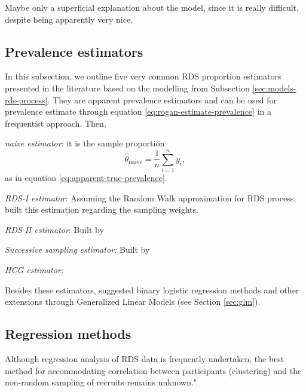 Maybe only a superficial explanation about the model, since it is really
difficult, despite being apparently very nice. \cite{mclaughlin2021bayesian}

\subsection{Prevalence estimators}

In this subsection, we outline five very common RDS proportion estimators presented in the
literature based on the modelling from Subsection
\ref{sec:models-rds-process}. They are apparent prevalence estimators and can
be used for prevalence estimate through equation
\eqref{eq:rogan-estimate-prevalence} in a frequentist approach. Then,  

\begin{alineas}
  \item {\em naive estimator}: it is the sample proportion 
  \begin{equation*}
    \hat{\theta}_{\mathrm{naive}} = \frac{1}{n}\sum_{i=1}^n y_i,
  \end{equation*} 
  as in equation \eqref{eq:apparent-true-prevalence}. 

  \item {\em RDS-I estimator}: Assuming the Random Walk approximation for RDS
  process, \textcite{salganik2004sampling} built this estimation regarding the
  sampling weights.  
  
  \item {\em RDS-II estimator}: Built by \cite{volz2008probability}
  \item {\em Successive sampling estimator:} Built by \cite{gile2011improved} 
  \item {\em HCG estimator:} 
\end{alineas}

Besides these estimators, \textcite{avery2021statistical} suggested binary logistic
regression methods and other extensions through Generalized Linear Models (see
Section \ref{sec:glm}). 

\subsection{Regression methods}

Although regression analysis of RDS data is frequently undertaken, the best method for accommodating
  correlation between participants (clustering) and the non-random sampling of
  recruits remains unknown."

